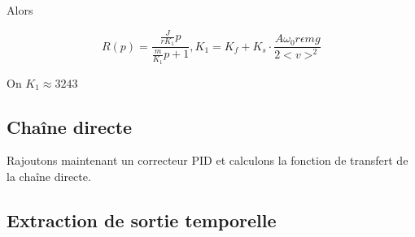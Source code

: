 \documentclass[11pt]{article} %
\begin{document}
Alors

\begin{equation} R(p) = \frac{\frac{J}{r K_1}p}{\frac{m}{K_1}p + 1} , K_1 = K_f + K_s \cdot \frac{A\omega_0 r \epsilon mg}{2<v>^2}\end{equation}

On \begin{math} K_1 \approx 3243 \end{math}

\subsection{Chaîne directe}

Rajoutons maintenant un correcteur PID et calculons la fonction de transfert de la chaîne directe.


\subsection{Extraction de sortie temporelle}
\end{document}
